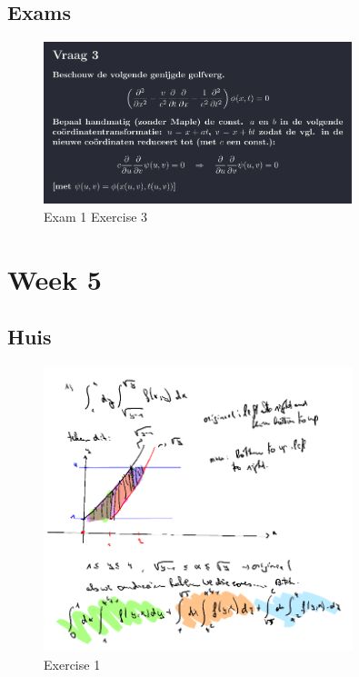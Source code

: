 \documentclass[a4paper]{report}
\begin{document}
\subsection{Exams}

\begin{figure}[H]
	\centering
	\includegraphics[width=0.8\textwidth]{assets/exam_1_ex_3.png}
	\caption{Exam 1 Exercise 3}
	\label{fig:exam_1_ex_3}
\end{figure}



\section{Week 5}

\subsection{Huis}

\begin{figure}[H]
	\centering
	\includegraphics[width=0.8\textwidth]{assets/huis_5_ex_1.png}
	\caption{Exercise 1}
	\label{fig:huis_5_ex_1}
\end{figure}
\end{document}
